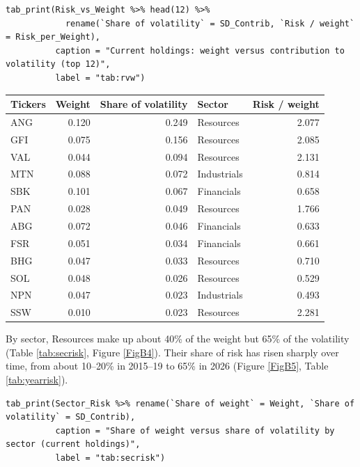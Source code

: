 \documentclass[11pt,preprint]{elsarticle}
\let\origtable\table
\let\endorigtable\endtable
\renewenvironment{table}[1][2] {
    \expandafter\origtable\expandafter[H]
} {
    \endorigtable
}
\numberwithin{equation}{section}
\numberwithin{figure}{section}
\numberwithin{table}{section}
\begin{document}
\begin{verbatim}
tab_print(Risk_vs_Weight %>% head(12) %>%
            rename(`Share of volatility` = SD_Contrib, `Risk / weight` = Risk_per_Weight),
          caption = "Current holdings: weight versus contribution to volatility (top 12)",
          label = "tab:rvw")
\end{verbatim}

\begin{table}[!htbp]
\centering
\caption{Current holdings: weight versus contribution to volatility (top 12)} 
\label{tab:rvw}
\begingroup\footnotesize
\begin{tabular}{lrrlr}
  \hline
Tickers & Weight & Share of volatility & Sector & Risk / weight \\ 
  \hline
ANG & 0.120 & 0.249 & Resources & 2.077 \\ 
  GFI & 0.075 & 0.156 & Resources & 2.085 \\ 
  VAL & 0.044 & 0.094 & Resources & 2.131 \\ 
  MTN & 0.088 & 0.072 & Industrials & 0.814 \\ 
  SBK & 0.101 & 0.067 & Financials & 0.658 \\ 
  PAN & 0.028 & 0.049 & Resources & 1.766 \\ 
  ABG & 0.072 & 0.046 & Financials & 0.633 \\ 
  FSR & 0.051 & 0.034 & Financials & 0.661 \\ 
  BHG & 0.047 & 0.033 & Resources & 0.710 \\ 
  SOL & 0.048 & 0.026 & Resources & 0.529 \\ 
  NPN & 0.047 & 0.023 & Industrials & 0.493 \\ 
  SSW & 0.010 & 0.023 & Resources & 2.281 \\ 
   \hline
\end{tabular}
\endgroup
\end{table}

By sector, Resources make up about 40\% of the weight but 65\% of the
volatility (Table \ref{tab:secrisk}, Figure \ref{FigB4}). Their share of
risk has risen sharply over time, from about 10--20\% in 2015--19 to
65\% in 2026 (Figure \ref{FigB5}, Table \ref{tab:yearrisk}).

\begin{verbatim}
tab_print(Sector_Risk %>% rename(`Share of weight` = Weight, `Share of volatility` = SD_Contrib),
          caption = "Share of weight versus share of volatility by sector (current holdings)",
          label = "tab:secrisk")
\end{verbatim}
\end{document}
